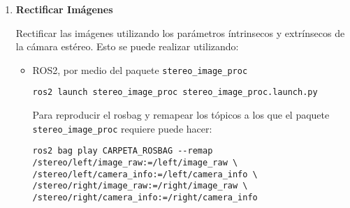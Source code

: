 \documentclass[tp]{lcc}
\begin{document}
\begin{enumerate}
    
    
    \item \textbf{Rectificar Imágenes}
    
    Rectificar las imágenes utilizando los parámetros íntrinsecos y extrínsecos de la cámara estéreo. Esto se puede realizar utilizando:
    
    \begin{itemize}
        \item ROS2, por medio del paquete \lstinline{stereo_image_proc}
        
\begin{lstlisting}[style=bash]     
ros2 launch stereo_image_proc stereo_image_proc.launch.py
\end{lstlisting}
        
        Para reproducir el rosbag y remapear los tópicos a los que el paquete \lstinline{stereo_image_proc} requiere puede hacer:
\begin{lstlisting}[style=bash]   
ros2 bag play CARPETA_ROSBAG --remap /stereo/left/image_raw:=/left/image_raw \
/stereo/left/camera_info:=/left/camera_info \
/stereo/right/image_raw:=/right/image_raw \
/stereo/right/camera_info:=/right/camera_info
\end{lstlisting}
        

\end{itemize}
\end{enumerate}
\end{document}
